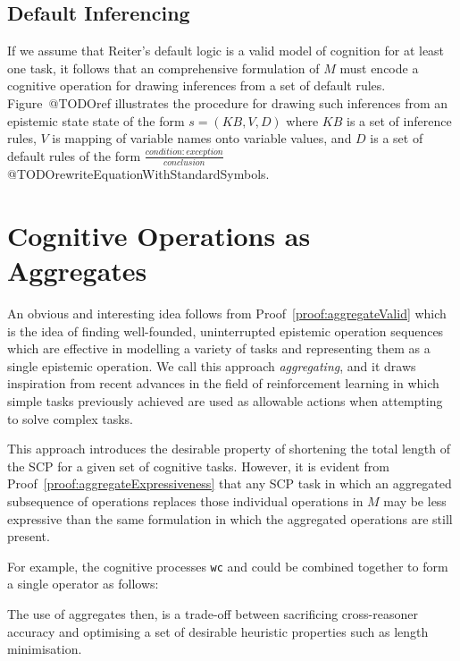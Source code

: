 \subsection{Default Inferencing}
If we assume that Reiter's default logic is a valid model of cognition for at least one task, it follows that an comprehensive formulation of $M$ must encode a cognitive operation for drawing inferences from a set of default rules. Figure~@TODOref illustrates the procedure for drawing such inferences from an epistemic state state of the form $s=(KB,V,D)$ where $KB$ is a set of inference rules, $V$ is mapping of variable names onto variable values, and $D$ is a set of default rules of the form $\frac{condition:exception}{conclusion}$ @TODOrewriteEquationWithStandardSymbols.




\section{Cognitive Operations as Aggregates}
An obvious and interesting idea follows from Proof~\ref{proof:aggregateValid} which is the idea of finding well-founded, uninterrupted epistemic operation sequences which are effective in modelling a variety of tasks and representing them as a single epistemic operation. We call this approach \textit{aggregating}, and it draws inspiration from recent advances in the field of reinforcement learning \citep{drummond2002accelerating} in which simple tasks previously achieved are used as allowable actions when attempting to solve complex tasks.

This approach introduces the desirable property of shortening the total length of the SCP for a given set of cognitive tasks. However, it is evident from Proof~\ref{proof:aggregateExpressiveness} that any SCP task in which an aggregated subsequence of operations replaces those individual operations in $M$ may be less expressive than the same formulation in which the aggregated operations are still present.

For example, the cognitive processes \texttt{wc} and  could be combined together to form a single  operator as follows:



The use of aggregates then, is a trade-off between sacrificing cross-reasoner accuracy and optimising a set of desirable heuristic properties such as length minimisation.

